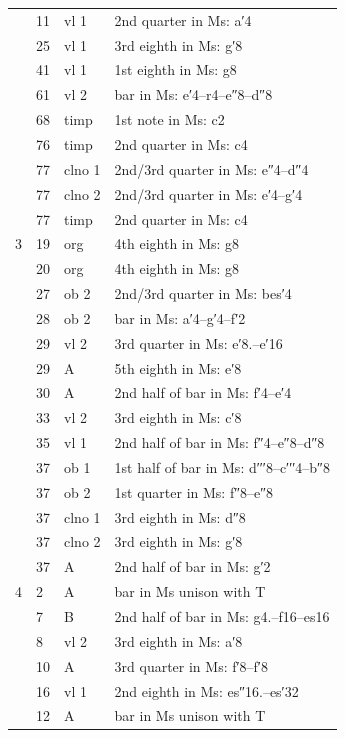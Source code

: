 \documentclass[parskip=full]{scrreprt}
\begin{document}
\begin{longtable}{lll L{10cm}}
    & 11 & vl 1    & 2nd quarter in Ms: a′4 \\
    & 25 & vl 1    & 3rd eighth in Ms: g′8 \\
    & 41 & vl 1    & 1st eighth in Ms: g8 \\
    & 61 & vl 2    & bar in Ms: e′4–r4–e″8–d″8 \\
    & 68 & timp    & 1st note in Ms: c2 \\
    & 76 & timp    & 2nd quarter in Ms: c4 \\
    & 77 & clno 1  & 2nd/3rd quarter in Ms: e″4–d″4 \\
    & 77 & clno 2  & 2nd/3rd quarter in Ms: e′4–g′4 \\
    & 77 & timp    & 2nd quarter in Ms: c4 \\
  3 & 19 & org     & 4th eighth in Ms: g8 \\
    & 20 & org     & 4th eighth in Ms: g8 \\
    & 27 & ob 2    & 2nd/3rd quarter in Ms: bes′4 \\
    & 28 & ob 2    & bar in Ms: a′4–g′4–f′2 \\
    & 29 & vl 2    & 3rd quarter in Ms: e′8.–e′16 \\
    & 29 & A       & 5th eighth in Ms: e′8 \\
    & 30 & A       & 2nd half of bar in Ms: f′4–e′4 \\
    & 33 & vl 2    & 3rd eighth in Ms: c′8 \\
    & 35 & vl 1    & 2nd half of bar in Ms: f″4–e″8–d″8 \\
    & 37 & ob 1    & 1st half of bar in Ms: d′′′8–c′′′4–b″8 \\
    & 37 & ob 2    & 1st quarter in Ms: f″8–e″8 \\
    & 37 & clno 1  & 3rd eighth in Ms: d″8 \\
    & 37 & clno 2  & 3rd eighth in Ms: g′8 \\
    & 37 & A       & 2nd half of bar in Ms: g′2 \\
  4 & 2  & A       & bar in Ms unison with T \\
    & 7  & B       & 2nd half of bar in Ms: g4.–f16–es16 \\
    & 8  & vl 2    & 3rd eighth in Ms: a′8 \\
    & 10 & A       & 3rd quarter in Ms: f′8–f′8 \\
    & 16 & vl 1    & 2nd eighth in Ms: es″16.–es′32 \\
    & 12 & A       & bar in Ms unison with T \\

\end{longtable}
\end{document}
